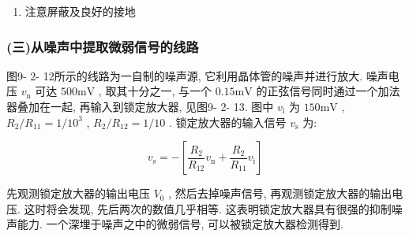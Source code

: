 \documentclass[12pt,a4paper]{article}
\begin{document}
\begin{enumerate}
    动态储备是指在确定的灵敏度条件下,不相干信号允许的最大过载电平与满刻度输出所需的相干输入电平之比.它表示噪声或干扰比满刻度读数大多少分贝而锁定放大器还不过载, 它也决定了噪声或干扰比满刻度信号电平大多少倍时, 仪器还能从这些强干扰信号中检测出信号.

    输出动态范围是指在确定的灵敏度条件下, 给出满刻度输出时输入电平与最小能检出的相干输入电平之比. 它表示能测量的最小信号为满刻度读数的多少分之一.

    输入总动态范围是指在确定的灵敏度条件下, 允许的最大不相干电压与最小能检出的相干输入电压之比.

    由此可见, 如果用对数表示, 输入总动态范围等于动态储备与输出动态范围之和. 从设计锁定放大器角度考虑, 就是如何不断提高输入总动态范围的问题, 也就是既要提高动态储备, 又要减少直流漂移. 当直流放大器的元器件及电路选定以后, 漂移就由直流增益决定. 因此, 锁定放大器设计的中心问题是怎样既能得到足够大的交流增益, 又能得到大的动态储备. 从使用锁定放大器角度考虑, 输入总动态范围往往是给定的, 而满刻度信号输入电平的选择, 则根据所测对象的要求而定. 当被测信号噪声大时, 需适当减少交流增益, 即相敏检波器前的放大倍数需减少, 使有足够的动态储备, 避免噪声引起锁定放大器过载. 在总增益一定的情况下, 减少了交流增益, 就要增加相敏检波器后的直流增益, 即动态储备的提高是以增大漂移为代价的. 当被测信号的噪声不大时, 则可增加交流增益、减少直流增益、增加输出动态范围、相对地压缩动态储备而获得低漂移的正确测量. 有的锁定放大器设有高储备和高稳定的开关, 分别提供上述两种情况.

    \item 注意屏蔽及良好的接地
\end{enumerate}

\subsubsection*{(三)从噪声中提取微弱信号的线路}

图9- 2- 12所示的线路为一自制的噪声源, 它利用晶体管的噪声并进行放大. 噪声电压 \(v_{\mathrm{n}}\) 可达 \(500 \mathrm{mV}\) , 取其十分之一, 与一个 \(0.15 \mathrm{mV}\) 的正弦信号同时通过一个加法器叠加在一起, 再输入到锁定放大器, 见图9- 2- 13. 图中 \(v_{\mathrm{i}}\) 为 \(150 \mathrm{mV}\) , \(R_{2} / R_{11} = 1 / 10^{3}\) , \(R_{2} / R_{12} = 1 / 10\) . 锁定放大器的输入信号 \(v_{\mathrm{s}}\) 为:

\[
v_{\mathrm{s}} = -\left[\frac{R_{2}}{R_{12}} v_{\mathrm{n}} + \frac{R_{2}}{R_{11}} v_{\mathrm{i}}\right]
\]

先观测锁定放大器的输出电压 \(V_{0}\) , 然后去掉噪声信号, 再观测锁定放大器的输出电压. 这时将会发现, 先后两次的数值几乎相等. 这表明锁定放大器具有很强的抑制噪声能力. 一个深埋于噪声之中的微弱信号, 可以被锁定放大器检测得到.
\end{document}
